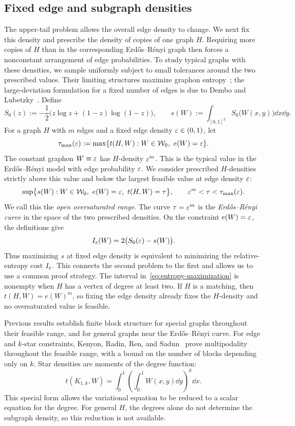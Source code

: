 \subsection{Fixed edge and subgraph densities}\label{sec:intro-fixed}

The upper-tail problem allows the overall edge density to change. We
next fix this density and prescribe the density of copies of one graph
$H$. Requiring more copies of $H$ than in the corresponding
Erd\H{o}s--R\'enyi graph then forces a nonconstant arrangement of edge
probabilities. To study typical graphs with these densities, we sample
uniformly subject to small tolerances around the two prescribed values.
Their limiting structures maximize graphon
entropy~\cite{RadinSadun2013,RadinRenSadun2014};
the large-deviation formulation for a fixed number of edges is due to
Dembo and Lubetzky~\cite{DemboLubetzky2018}. Define
\[
  S_0(z):=-\frac12\bigl(z\log z+(1-z)\log(1-z)\bigr),
  \qquad s(W):=\int_{[0,1]^2}S_0\bigl(W(x,y)\bigr)\dd x\dd y.
\]
For a graph $H$ with $m$ edges and a fixed edge density $\varepsilon\in(0,1)$,
let
\[
  \tau_{\max}(\eps):=\max\{t(H,W):W\in\W_0,\ e(W)=\eps\}.
\]
The constant graphon $W\equiv\varepsilon$ has $H$-density $\varepsilon^m$. This is the
typical value in the Erd\H{o}s--R\'enyi model with edge probability $\varepsilon$.
We consider prescribed $H$-densities strictly above this value and below
the largest feasible value at edge density $\varepsilon$:
\begin{equation}\label{eq:entropy-maximization}
  \sup\bigl\{s(W):W\in\mathcal W_0,\ e(W)=\varepsilon,\ t(H,W)=\tau\bigr\},
  \qquad \varepsilon^m<\tau<\tau_{\max}(\varepsilon).
\end{equation}
We call this the \emph{open oversaturated range}. The curve
$\tau=\varepsilon^m$ is the \emph{Erd\H{o}s--R\'enyi curve} in the space of the
two prescribed densities.
On the constraint $e(W)=\varepsilon$, the definitions give
\[
  I_\varepsilon(W)=2\bigl(S_0(\varepsilon)-s(W)\bigr).
\]
Thus maximizing $s$ at fixed edge density is equivalent to minimizing
the relative-entropy cost $I_\varepsilon$. This connects the second problem to
the first and allows us to use a common proof strategy. The interval
in~\eqref{eq:entropy-maximization} is nonempty when $H$ has a vertex of
degree at least two. If $H$ is a matching, then $t(H,W)=e(W)^m$, so fixing
the edge density already fixes the $H$-density and no oversaturated
value is feasible.

Previous results establish finite block structure for special graphs
throughout their feasible range, and for general graphs near the
Erd\H{o}s--R\'enyi curve.
For edge and $k$-star constraints, Kenyon, Radin, Ren, and
Sadun~\cite{KenyonRadinRenSadun2017} prove multipodality throughout the
feasible range, with a bound on the number of blocks depending only on
$k$. Star densities are moments of the degree function:
\[
  t(K_{1,k},W)=\int_0^1\left(\int_0^1W(x,y)\dd y\right)^k\dd x.
\]
This special form allows the variational equation to be reduced to a
scalar equation for the degree. For general $H$, the degrees alone do
not determine the subgraph density, so this reduction is not available.

